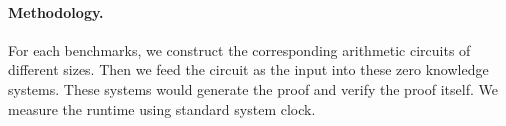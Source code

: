 \paragraph{Methodology.} For each benchmarks, we construct the corresponding arithmetic circuits of different sizes. Then we feed the circuit as the input into these zero knowledge systems. These systems would generate the proof and verify the proof itself. We measure the runtime using standard system clock.\\
\begin{figure}[htbp]
{}%
%
\end{figure}
